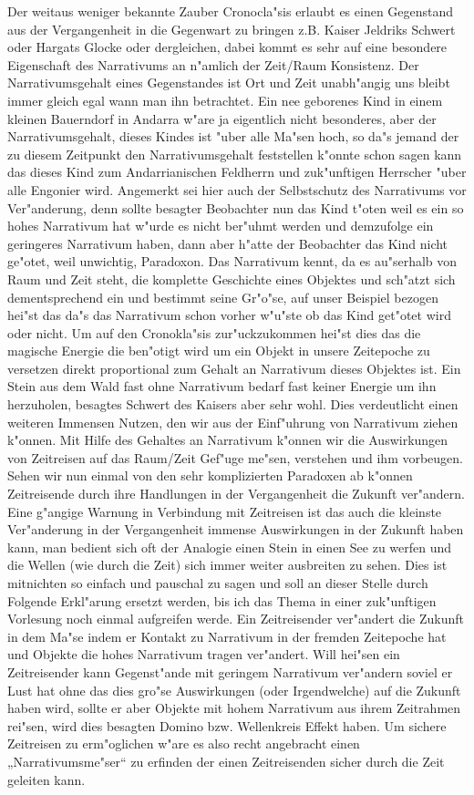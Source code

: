 \documentclass[a5paper,8pt]{book}
\begin{document}
Der weitaus weniger bekannte Zauber Cronocla"sis erlaubt es einen Gegenstand aus der Vergangenheit in die Gegenwart zu bringen z.B. Kaiser Jeldriks Schwert oder Hargats Glocke oder dergleichen, dabei kommt es sehr auf eine besondere Eigenschaft des Narrativums an n"amlich der Zeit/Raum Konsistenz. Der Narrativumsgehalt eines Gegenstandes ist Ort und Zeit unabh"angig uns bleibt immer gleich egal wann man ihn betrachtet. Ein nee geborenes Kind in einem kleinen Bauerndorf in Andarra w"are ja eigentlich nicht besonderes, aber der Narrativumsgehalt, dieses Kindes ist "uber alle Ma"sen hoch, so da"s jemand der zu diesem Zeitpunkt den Narrativumsgehalt feststellen k"onnte schon sagen kann das dieses Kind zum Andarrianischen Feldherrn und zuk"unftigen Herrscher "uber alle Engonier wird. Angemerkt sei hier auch der Selbstschutz des Narrativums vor Ver"anderung, denn sollte besagter Beobachter nun das Kind t"oten weil es ein so hohes Narrativum hat w"urde es nicht ber"uhmt werden und demzufolge ein geringeres 
Narrativum haben, dann aber h"atte der Beobachter das Kind nicht ge"otet, weil unwichtig, Paradoxon. Das Narrativum kennt, da es au"serhalb von Raum und Zeit steht, die komplette Geschichte eines Objektes und sch"atzt sich dementsprechend ein und bestimmt seine Gr"o"se, auf unser Beispiel bezogen hei"st das da"s das Narrativum schon vorher w"u"ste ob das Kind get"otet wird oder nicht.
Um auf den Cronokla"sis zur"uckzukommen hei"st dies das die magische Energie die ben"otigt wird um ein Objekt in unsere Zeitepoche zu versetzen direkt proportional zum Gehalt an Narrativum dieses Objektes ist. Ein Stein aus dem Wald fast ohne Narrativum bedarf fast keiner Energie um ihn herzuholen, besagtes Schwert des Kaisers aber sehr wohl.
Dies verdeutlicht einen weiteren Immensen Nutzen, den wir aus der Einf"uhrung von Narrativum ziehen k"onnen. Mit Hilfe des Gehaltes an Narrativum k"onnen wir die Auswirkungen von Zeitreisen auf das Raum/Zeit Gef"uge me"sen, verstehen und ihm vorbeugen. Sehen wir nun einmal von den sehr komplizierten Paradoxen ab k"onnen Zeitreisende durch ihre Handlungen in der Vergangenheit die Zukunft ver"andern. Eine g"angige Warnung in Verbindung mit Zeitreisen ist das auch die kleinste Ver"anderung in der Vergangenheit immense Auswirkungen in der Zukunft haben kann, man bedient sich oft der Analogie einen Stein in einen See zu werfen und die Wellen (wie durch die Zeit) sich immer weiter ausbreiten zu sehen. Dies ist mitnichten so einfach und pauschal zu sagen und soll an dieser Stelle durch Folgende Erkl"arung ersetzt werden, bis ich das Thema in einer zuk"unftigen Vorlesung noch einmal aufgreifen werde. Ein Zeitreisender ver"andert die Zukunft in dem Ma"se indem er Kontakt zu Narrativum in der fremden Zeitepoche hat 
und Objekte die hohes Narrativum tragen ver"andert. Will hei"sen ein Zeitreisender kann Gegenst"ande mit geringem Narrativum ver"andern soviel er Lust hat ohne das dies gro"se Auswirkungen (oder Irgendwelche) auf die Zukunft haben wird, sollte er aber Objekte mit hohem Narrativum aus ihrem Zeitrahmen rei"sen, wird dies besagten Domino bzw. Wellenkreis Effekt haben. Um sichere Zeitreisen zu erm"oglichen w"are es also recht angebracht einen „Narrativumsme"ser“ zu erfinden der einen Zeitreisenden sicher durch die Zeit geleiten kann.
\end{document}
